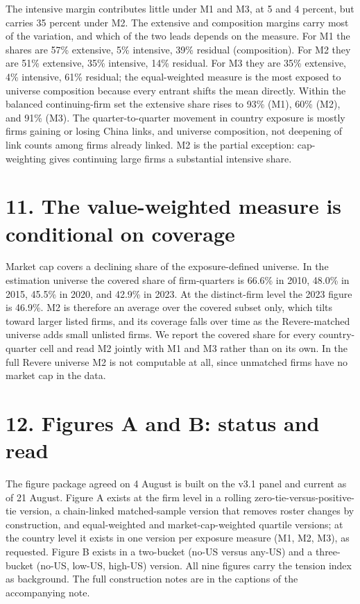 \documentclass[11pt]{article}
\begin{document}
The intensive margin contributes little under M1 and M3, at 5 and 4 percent,
but carries 35 percent under M2. The extensive and composition margins carry
most of the variation, and which of the two leads depends on the measure. For
M1 the shares are 57\% extensive, 5\% intensive, 39\% residual (composition).
For M2 they are 51\% extensive, 35\% intensive, 14\% residual. For M3 they are
35\% extensive, 4\% intensive, 61\% residual; the equal-weighted measure is
the most exposed to universe composition because every entrant shifts the mean
directly. Within the balanced continuing-firm set the extensive share rises to
93\% (M1), 60\% (M2), and 91\% (M3). The quarter-to-quarter movement in
country exposure is mostly firms gaining or losing China links, and universe
composition, not deepening of link counts among firms already linked. M2 is
the partial exception: cap-weighting gives continuing large firms a
substantial intensive share.

\section*{11. The value-weighted measure is conditional on coverage}

Market cap covers a declining share of the exposure-defined universe. In the
estimation universe the covered share of firm-quarters is 66.6\% in 2010,
48.0\% in 2015, 45.5\% in 2020, and 42.9\% in 2023. At the distinct-firm level
the 2023 figure is 46.9\%. M2 is therefore an average over the covered subset
only, which tilts toward larger listed firms, and its coverage falls over time
as the Revere-matched universe adds small unlisted firms. We report the
covered share for every country-quarter cell and read M2 jointly with M1 and
M3 rather than on its own. In the full Revere universe M2 is not computable at
all, since unmatched firms have no market cap in the data.

\section*{12. Figures A and B: status and read}

The figure package agreed on 4 August is built on the v3.1 panel and current
as of 21 August. Figure A exists at the firm level in a rolling
zero-tie-versus-positive-tie version, a chain-linked matched-sample version
that removes roster changes by construction, and equal-weighted and
market-cap-weighted quartile versions; at the country level it exists in one
version per exposure measure (M1, M2, M3), as requested. Figure B exists in a
two-bucket (no-US versus any-US) and a three-bucket (no-US, low-US, high-US)
version. All nine figures carry the tension index as background. The full
construction notes are in the captions of the accompanying note.
\end{document}
